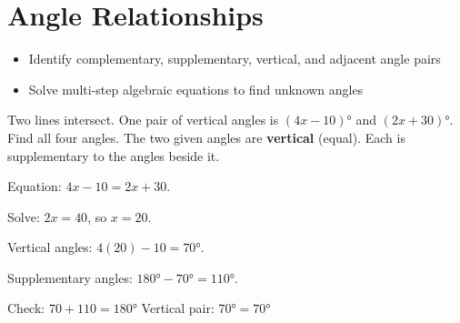 \section{Angle Relationships}

\begin{stepGoal}
\begin{itemize}
    \item Identify complementary, supplementary, vertical, and adjacent angle pairs
    \item Solve multi-step algebraic equations to find unknown angles
\end{itemize}
\end{stepGoal}

\begin{stepVocabBox}
\end{stepVocabBox}

\begin{stepsCard}
\end{stepsCard}

\begin{stepExample}{Two lines intersect. One pair of vertical angles is $(4x - 10)°$ and $(2x + 30)°$. Find all four angles.}
     The two given angles are \textbf{vertical} (equal). Each is supplementary to the angles beside it.

     Equation: $4x - 10 = 2x + 30$.

     Solve: $2x = 40$, so $x = 20$.\par
    Vertical angles: $4(20) - 10 = 70°$.\par
    Supplementary angles: $180° - 70° = 110°$.

     Check: $70 + 110 = 180°$ \checkmark \quad Vertical pair: $70° = 70°$ \checkmark
\end{stepExample}

